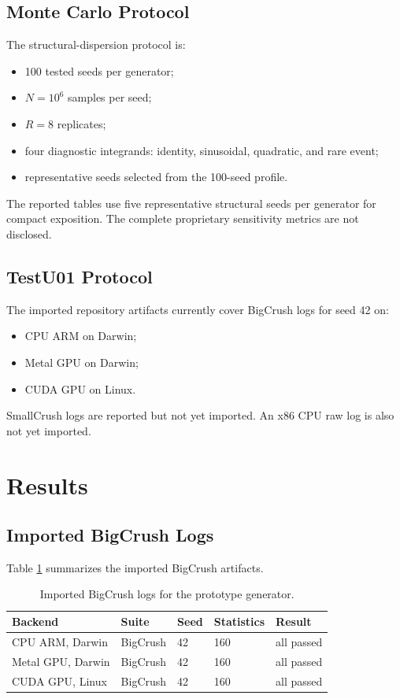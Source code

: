 \documentclass[11pt,a4paper]{article}
\begin{document}
\subsection{Monte Carlo Protocol}

The structural-dispersion protocol is:

\begin{itemize}[nosep]
  \item 100 tested seeds per generator;
  \item $N=10^6$ samples per seed;
  \item $R=8$ replicates;
  \item four diagnostic integrands: identity, sinusoidal, quadratic, and rare event;
  \item representative seeds selected from the 100-seed profile.
\end{itemize}

The reported tables use five representative structural seeds per generator for compact exposition. The complete proprietary sensitivity metrics are not disclosed.

\subsection{TestU01 Protocol}

The imported repository artifacts currently cover BigCrush logs for seed 42 on:

\begin{itemize}[nosep]
  \item CPU ARM on Darwin;
  \item Metal GPU on Darwin;
  \item CUDA GPU on Linux.
\end{itemize}

SmallCrush logs are reported but not yet imported. An x86 CPU raw log is also not yet imported.

\section{Results}

\subsection{Imported BigCrush Logs}

Table \ref{tab:bigcrush} summarizes the imported BigCrush artifacts.

\begin{table}[ht]
\centering
\small
\begin{tabular}{lllll}
\toprule
Backend & Suite & Seed & Statistics & Result \\
\midrule
CPU ARM, Darwin & BigCrush & 42 & 160 & all passed \\
Metal GPU, Darwin & BigCrush & 42 & 160 & all passed \\
CUDA GPU, Linux & BigCrush & 42 & 160 & all passed \\
\bottomrule
\end{tabular}
\caption{Imported BigCrush logs for the prototype generator.}
\label{tab:bigcrush}
\end{table}
\end{document}
